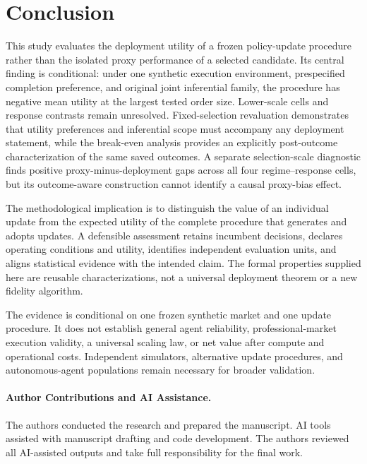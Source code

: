 \documentclass[10pt,letterpaper]{article}
\begin{document}
\section{Conclusion}
This study evaluates the deployment utility of a frozen policy-update procedure rather than the isolated proxy performance of a selected candidate. Its central finding is conditional: under one synthetic execution environment, prespecified completion preference, and original joint inferential family, the procedure has negative mean utility at the largest tested order size. Lower-scale cells and response contrasts remain unresolved. Fixed-selection revaluation demonstrates that utility preferences and inferential scope must accompany any deployment statement, while the break-even analysis provides an explicitly post-outcome characterization of the same saved outcomes. A separate selection-scale diagnostic finds positive proxy-minus-deployment gaps across all four regime--response cells, but its outcome-aware construction cannot identify a causal proxy-bias effect.

The methodological implication is to distinguish the value of an individual update from the expected utility of the complete procedure that generates and adopts updates. A defensible assessment retains incumbent decisions, declares operating conditions and utility, identifies independent evaluation units, and aligns statistical evidence with the intended claim. The formal properties supplied here are reusable characterizations, not a universal deployment theorem or a new fidelity algorithm.

The evidence is conditional on one frozen synthetic market and one update procedure. It does not establish general agent reliability, professional-market execution validity, a universal scaling law, or net value after compute and operational costs. Independent simulators, alternative update procedures, and autonomous-agent populations remain necessary for broader validation.

\paragraph{Author Contributions and AI Assistance.}
The authors conducted the research and prepared the manuscript. AI tools assisted with manuscript drafting and code development. The authors reviewed all AI-assisted outputs and take full responsibility for the final work.



\appendix
\end{document}
